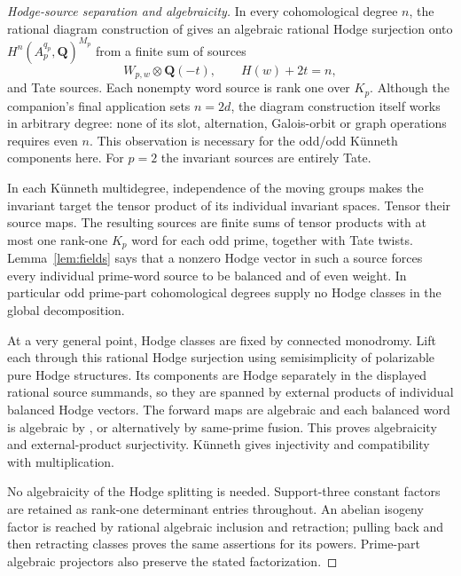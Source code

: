 \documentclass[11pt]{article}
\theoremstyle{definition}
\newcommand{\Q}{\mathbf Q}
\begin{document}
\begin{proof}[Hodge-source separation and algebraicity]
In every cohomological degree $n$, the rational diagram construction of
\cite[Section 5]{General} gives an algebraic rational Hodge surjection
onto $H^n(A_p^{q_p},\Q)^{M_p}$ from a finite sum of sources
\[
                        W_{p,w}\otimes\Q(-t),
                        \qquad H(w)+2t=n,
\]
and Tate sources. Each nonempty word source is rank one over $K_p$.
Although the companion's final application sets $n=2d$, the diagram
construction itself works in arbitrary degree: none of its slot,
alternation, Galois-orbit or graph operations requires even $n$.
This observation is necessary for the odd/odd K\"unneth components here.
For $p=2$ the invariant sources are entirely Tate.

In each K\"unneth multidegree, independence of the moving groups makes
the invariant target the tensor product of its individual invariant
spaces. Tensor their source maps. The resulting sources are finite sums
of tensor products with at most one rank-one $K_p$ word for each odd
prime, together with Tate twists. Lemma~\ref{lem:fields} says that a
nonzero Hodge vector in such a source forces every individual prime-word
source to be balanced and of even weight. In particular odd prime-part
cohomological degrees supply no Hodge classes in the global decomposition.

At a very general point, Hodge classes are fixed by connected monodromy.
Lift each through this rational Hodge surjection using semisimplicity of
polarizable pure Hodge structures. Its components are Hodge separately
in the displayed rational source summands, so they are spanned by external
products of individual balanced Hodge vectors. The forward maps are
algebraic and each balanced word is algebraic by
\cite[Corollary 1.2]{Fermat}, or alternatively by same-prime fusion.
This proves algebraicity and external-product surjectivity. K\"unneth
gives injectivity and compatibility with multiplication.

No algebraicity of the Hodge splitting is needed. Support-three constant
factors are retained as rank-one determinant entries throughout.
An abelian isogeny factor is reached by rational algebraic inclusion and
retraction; pulling back and then retracting classes proves the same
assertions for its powers. Prime-part algebraic projectors also preserve
the stated factorization.
\end{proof}
\end{document}

